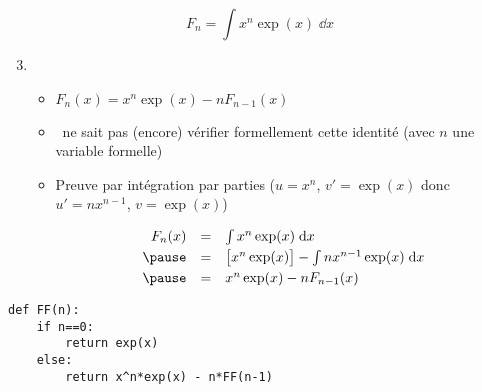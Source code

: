 \begin{frame}[fragile]
\vspace*{-1ex}

$$F_n = \int x^n \exp(x) \; \dd x$$

\vspace*{-1ex}
\pause 


\begin{enumerate}
\setcounter{enumi}{2}
  \item
    \begin{itemize}
      \item $F_n(x) = x^n \exp(x) - nF_{n-1}(x)$
    \pause  
      
      \item \Sage\ ne sait pas (encore) vérifier formellement cette identité 
    (avec $n$ une variable formelle)
    
    \pause
    
      \item Preuve par intégration par parties 
    ($u=x^n$, $v'=\exp(x)$ donc $u'=nx^{n-1}$, $v = \exp(x)$)
    
    
    \vspace*{-0.5ex}
    \pause
    
    $$\begin{array}{rcl}
    F_n(x) 
    & = & \int x^n \exp(x)\; \dd x \\[1mm]
    \pause 
    & = & \big[x^n\exp(x)\big] - \int nx^{n-1}\exp(x)\; \dd x\\[1mm]
    \pause
    & = & x^n\exp(x) - n F_{n-1}(x)
    \end{array}$$
    
    \vspace*{-1.5ex}
    
    \end{itemize}
\end{enumerate}


\pause

\begin{algo}
\begin{lstlisting}
def FF(n):
    if n==0:
        return exp(x)
    else:
        return x^n*exp(x) - n*FF(n-1)
\end{lstlisting}
\end{algo}

\end{frame}


